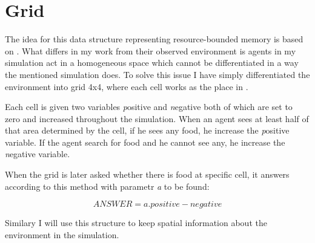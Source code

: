 \section{Grid}

The idea for this data structure representing resource-bounded memory is based on \cite{Brom:placeandobjects}. What differs in my work from their observed environment is agents in my simulation act in a homogeneous space which cannot be differentiated in a way the mentioned simulation does. To solve this issue I have simply differentiated the environment into grid 4x4, where each cell works as the place in \cite{Brom:placeandobjects}. 

Each cell is given two variables {\emph positive} and {\emph negative} both of which are set to zero and increased throughout the simulation. When an agent sees at least half of that area determined by the cell, if he sees any food, he increase the {\emph positive} variable. If the agent search for food and he cannot see any, he increase the {\emph negative} variable.

When the grid is later asked whether there is food at specific cell, it answers according to this method with parametr {\emph a} to be found:

\begin{equation} ANSWER = a.positive - negative 
\end{equation}
 
Similary I will use this structure to keep spatial information about the environment in the simulation.